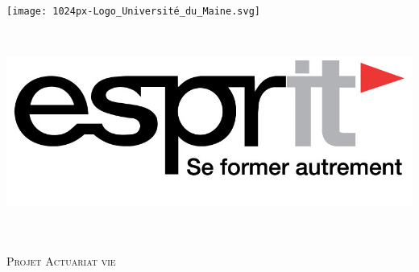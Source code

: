 \documentclass[french]{report}
\begin{document}
\pagestyle{fancy}
\fancyhf{}


\begin{titlepage}

\newcommand{\HRule}{\rule{\linewidth}{0.5mm}} %
\setlength{\topmargin}{0in}
\center %
 
 
\begin{minipage}{0.4\textwidth}
\begin{flushleft} \large
\hspace*{-0.5cm}
\texttt{[image: 1024px-Logo\_Université\_du\_Maine.svg]}\\
\end{flushleft}
\end{minipage}
~
\begin{minipage}{0.5\textwidth}
\begin{flushright} \large
\hspace*{2cm}
\includegraphics[scale=0.20]{Logo_ESPRIT_Ariana.jpg}\\
\end{flushright}
\end{minipage}\\[1cm]

\textsc{\Large }\\[2cm] %
\LARGE \textsc{Projet Actuariat vie } \\[1.5cm] 
\textsc{\large }\\[0.5cm] %



\end{titlepage}
\end{document}
